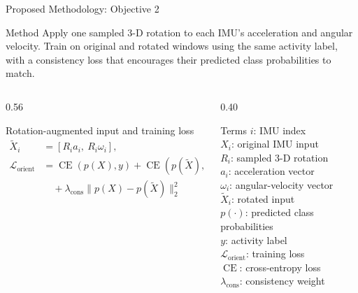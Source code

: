 \documentclass[10pt,aspectratio=169]{beamer}
\begin{document}
\begin{frame}[t]{Proposed Methodology: Objective 2}
\small
\begin{block}{Method}
Apply one sampled 3-D rotation to each IMU's acceleration and angular velocity. Train on original and rotated windows using the same activity label, with a consistency loss that encourages their predicted class probabilities to match.
\end{block}
\vspace{-2pt}
\begin{columns}[T,onlytextwidth]
\begin{column}{0.56\textwidth}
\begin{block}{Rotation-augmented input and training loss}
\footnotesize
\[
\begin{aligned}
\widetilde X_i&=\left[R_i a_i,\ R_i\omega_i\right],\\
\mathcal L_{\mathrm{orient}}&=\operatorname{CE}(p(X),y)
  +\operatorname{CE}(p(\widetilde X),y)\\
&\quad+\lambda_{\mathrm{cons}}\|p(X)-p(\widetilde X)\|_2^2
\end{aligned}
\]
\end{block}
\end{column}
\begin{column}{0.40\textwidth}
\begin{block}{Terms}
\footnotesize
$i$: IMU index\\
$X_i$: original IMU input\\
$R_i$: sampled 3-D rotation\\
$a_i$: acceleration vector\\
$\omega_i$: angular-velocity vector\\
$\widetilde X_i$: rotated input\\
$p(\cdot)$: predicted class probabilities\\
$y$: activity label\\
$\mathcal L_{\mathrm{orient}}$: training loss\\
$\operatorname{CE}$: cross-entropy loss\\
$\lambda_{\mathrm{cons}}$: consistency weight
\end{block}
\end{column}
\end{columns}
\end{frame}
\end{document}
